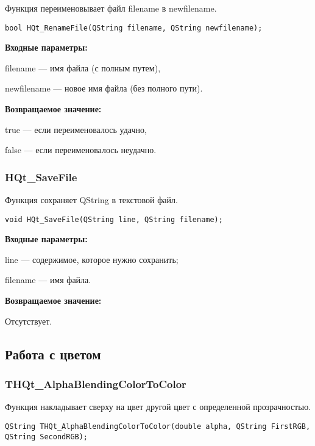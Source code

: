 \documentclass[a4paper,12pt]{article}
\begin{document}
Функция переименовывает файл filename в newfilename.


\begin{lstlisting}[label=code_syntax_HQt_RenameFile,caption=Синтаксис]
bool HQt_RenameFile(QString filename, QString newfilename);
\end{lstlisting}

\textbf{Входные параметры:}

filename --- имя файла (с полным путем),
 
    newfilename --- новое имя файла (без полного пути).

\textbf{Возвращаемое значение:}

true --- если переименовалось удачно,
 
    false --- если переименовалось неудачно.


\subsubsection{HQt\_SaveFile}\label{HQt_SaveFile}

Функция сохраняет QString в текстовой файл.


\begin{lstlisting}[label=code_syntax_HQt_SaveFile,caption=Синтаксис]
void HQt_SaveFile(QString line, QString filename);
\end{lstlisting}

\textbf{Входные параметры:}

line --- содержимое, которое нужно сохранить;
 
filename --- имя файла.

\textbf{Возвращаемое значение:}

Отсутствует.


\subsection{Работа с цветом}

\subsubsection{THQt\_AlphaBlendingColorToColor}\label{THQt_AlphaBlendingColorToColor}

Функция накладывает сверху на цвет другой цвет с определенной прозрачностью.


\begin{lstlisting}[label=code_syntax_THQt_AlphaBlendingColorToColor,caption=Синтаксис]
QString THQt_AlphaBlendingColorToColor(double alpha, QString FirstRGB, QString SecondRGB);
\end{lstlisting}
\end{document}
